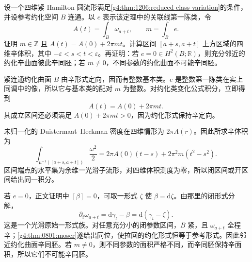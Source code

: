 \begin{optionalexercise}\label{g4:ex:1206:surface-reduction-slope}
	设一个四维紧 Hamilton 圆流形满足\cref{g4:thm:1206:reduced-class-variation}的条件，并设参考约化空间 \(B\) 连通。以 \(e\) 表示该定理中的关联线第一陈类，令
	\[
		A(t)=\int_B\omega_{a+t},\qquad
		m=\int_B e.
	\]
	证明 \(m\in\mathbb Z\) 且 \(A(t)=A(0)+2\pi mt\)。计算区间 \([a+s,a+t]\) 上方区域的四维辛体积，其中 \(-\varepsilon<s<t<\varepsilon\)。再证明：若 \(e=0\in H^2(B;\mathbb R)\)，则充分邻近的约化辛曲面彼此辛同胚；若 \(m\ne0\)，不同参数的约化曲面不可能辛同胚。
\end{optionalexercise}
\begin{solution}
	紧连通约化曲面 \(B\) 由辛形式定向，因而有整数基本类。\(e\) 是整数第一陈类在实上同调中的像，所以它与基本类的配对 \(m\) 为整数。对约化类变化公式积分，立即得到
	\[
		A(t)=A(0)+2\pi mt.
	\]
	其成立区间还必须满足 \(A(0)+2\pi mt>0\)，因为约化形式保持辛定向。

	未归一化的 Duistermaat--Heckman 密度在四维情形为 \(2\pi A(r)\)。因此所求辛体积为
	\[
		\int_{\mu^{-1}([a+s,a+t])}\frac{\omega^2}{2}
		=2\pi A(0)(t-s)+2\pi^2m(t^2-s^2).
	\]
	区间端点的水平集为余维一光滑子流形，对四维体积测度为零，所以闭区间或开区间给出同一积分。

	若 \(e=0\)，正文证明中 \([\beta]=0\)，可取一形式 \(\zeta\) 使 \(\beta=\mathrm{d}\zeta\)。由那里的闭形式分解，
	\[
		\partial_t\omega_{a+t}
		=\mathrm{d}\gamma_t-\beta
		=\mathrm{d}(\gamma_t-\zeta).
	\]
	这是一个光滑原始一形式族。对任意充分小的闭参数区间，\(B\) 紧，且 \(\omega_{a+t}\) 全程辛；\cref{g4:thm:0801:moser}遂给出同位，使拉回的约化形式恒等于参考形式。因此邻近约化曲面辛同胚。若 \(m\ne0\)，则不同参数的面积严格不同，而辛同胚保持辛面积，所以它们不可能辛同胚。
\end{solution}
